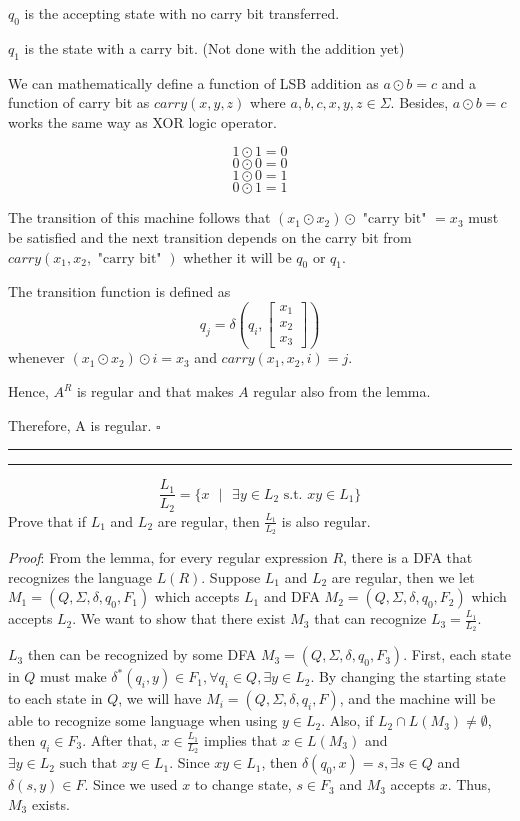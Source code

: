 \documentclass[a4paper, 11pt]{article}
\newcommand{\question}[2] {\vspace{.25in} \hrule\vspace{0.5em}
	\noindent{\bf #1: #2} \vspace{0.5em}
	\hrule \vspace{.10in}}
\begin{document}
	$q_0$ is the accepting state with no carry bit transferred.
	
	$q_1$ is the state with a carry bit. (Not done with the addition yet)
	
	We can mathematically define a function of LSB addition as $a \odot b = c$ and a function of carry bit as $carry(x,y,z)$ where $a,b,c,x,y,z \in \Sigma$. Besides, $a \odot b = c$ works the same way as XOR logic operator.
	
	$$1 \odot 1 = 0$$
	$$0 \odot 0 = 0$$
	$$1 \odot 0 = 1$$
	$$0 \odot 1 = 1$$
	
	The transition of this machine follows that $(x_1 \odot x_2) \odot \text{ "carry bit" } = x_3$ must be satisfied and the next transition depends on the carry bit from $carry(x_1, x_2, \text{ "carry bit" }) $ whether it will be $q_0$ or $q_1$. 
	
	The transition function is defined as
	\begin{equation*}
	q_j = \delta
	(q_i, \begin{bmatrix}
	x_1 \\
	x_2 \\
	x_3
	\end{bmatrix})
	\end{equation*}
	whenever $(x_1 \odot x_2) \odot i = x_3$ and $carry(x_1,x_2,i) = j$.
	
	Hence, $A^R$ is regular and that makes $A$ regular also from the lemma.
	
	Therefore, A is regular. $\square$
	
	\question{4}{Division Operation?} 
	
	$$\frac{L_1}{L_2} = \{x \text{ $|$ } \exists y \in L_2 \text{ s.t. } xy \in L_1 \}$$
	Prove that if $L_1$ and $L_2$ are regular, then $\frac{L_1}{L_2}$ is also regular.
	
	{\em Proof}: 
	From the lemma, for every regular expression $R$, there is a DFA that recognizes the language $L(R)$.
	Suppose $L_1$ and $L_2$ are regular, then we let $M_1 =(Q,\Sigma,\delta,q_0,F_1)$ which accepts $L_1$ and DFA $M_2 =(Q,\Sigma,\delta,q_0,F_2)$ which accepts $L_2$. We want to show that there exist $M_3$ that can recognize $L_3 = \frac{L_1}{L_2}$.
	
	$L_3$ then can be recognized by some DFA $M_3 = (Q,\Sigma,\delta,q_0,F_3)$. First, each state in $Q$ must make $ \delta^*(q_i, y) \in F_1 ,\forall q_i \in Q, \exists y \in L_2$. By changing the starting state to each state in $Q$, we will have $M_i = (Q,\Sigma,\delta, q_i, F)$, and the machine will be able to recognize some language when using $y \in L_2$. Also, if $L_2 \cap L(M_3) \neq \emptyset$, then $q_i \in F_3$. After that, $x \in \frac{L_1}{L_2}$ implies that $x \in L(M_3)$ and $\exists y \in L_2 \text{ such that } xy \in L_1 $. Since $xy \in L_1$, then $\delta(q_0,x) = s, \exists s \in Q$ and $\delta(s,y) \in F$. Since we used $x$ to change state, $s \in F_3$ and $M_3$ accepts $x$. Thus, $M_3$ exists.
	
\end{document}
